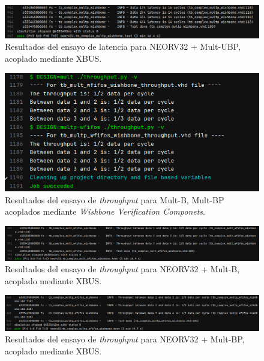 \begin{figure}[H]
    \centering
    \includegraphics[width=14cm]{Figuras/result/lat8.png}
    \caption{Resultados del ensayo de latencia para NEORV32 + Mult-UBP, acoplado mediante XBUS.}
    \label{fig:lat8}
\end{figure}

\begin{figure}[H]
    \centering
    \includegraphics[width=14cm]{Figuras/result/thr5.png}
    \caption{Resultados del ensayo de \textit{throughput} para Mult-B, Mult-BP acoplados mediante \textit{Wishbone Verification Componets}.}
    \label{fig:thr5}
\end{figure}

\begin{figure}[H]
    \centering
    \includegraphics[width=14cm]{Figuras/result/thr6.png}
    \caption{Resultados del ensayo de \textit{throughput} para NEORV32 + Mult-B, acoplado mediante XBUS.}
    \label{fig:thr6}
\end{figure}

\begin{figure}[H]
    \centering
    \includegraphics[width=14cm]{Figuras/result/thr7.png}
    \caption{Resultados del ensayo de \textit{throughput} para NEORV32 + Mult-BP, acoplado mediante XBUS.}
    \label{fig:thr7}
\end{figure}

